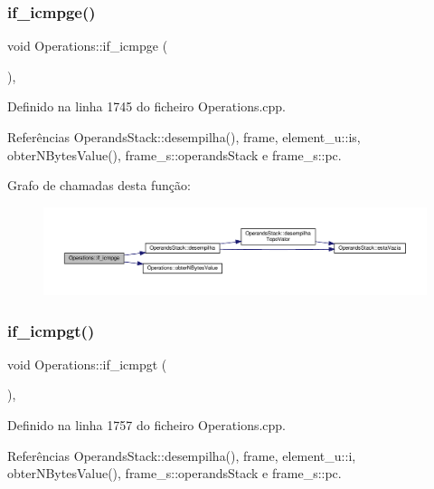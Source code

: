 \subsubsection{\texorpdfstring{if\+\_\+icmpge()}{if\_icmpge()}}
{\footnotesize\ttfamily void Operations\+::if\+\_\+icmpge (\begin{DoxyParamCaption}{ }\end{DoxyParamCaption})\hspace{0.3cm}{\ttfamily [static]}, {\ttfamily [private]}}



Definido na linha 1745 do ficheiro Operations.\+cpp.



Referências Operands\+Stack\+::desempilha(), frame, element\+\_\+u\+::is, obter\+N\+Bytes\+Value(), frame\+\_\+s\+::operands\+Stack e frame\+\_\+s\+::pc.

Grafo de chamadas desta função\+:\nopagebreak
\begin{figure}[H]
\begin{center}
\leavevmode
\includegraphics[width=350pt]{classOperations_a147f088fabd19030a535ac68ff091be1_cgraph}
\end{center}
\end{figure}
\mbox{\label{classOperations_a40232532d2522ef0afe261555688a7fd}} 
\subsubsection{\texorpdfstring{if\+\_\+icmpgt()}{if\_icmpgt()}}
{\footnotesize\ttfamily void Operations\+::if\+\_\+icmpgt (\begin{DoxyParamCaption}{ }\end{DoxyParamCaption})\hspace{0.3cm}{\ttfamily [static]}, {\ttfamily [private]}}



Definido na linha 1757 do ficheiro Operations.\+cpp.



Referências Operands\+Stack\+::desempilha(), frame, element\+\_\+u\+::i, obter\+N\+Bytes\+Value(), frame\+\_\+s\+::operands\+Stack e frame\+\_\+s\+::pc.

